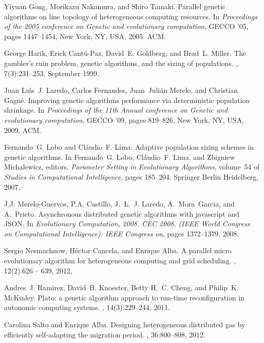 \documentclass[final,1p,times]{elsarticle}
\begin{document}
\begin{thebibliography}{10}
Yiyuan Gong, Morikazu Nakamura, and Shiro Tamaki.
\newblock Parallel genetic algorithms on line topology of heterogeneous
  computing resources.
\newblock In {\em Proceedings of the 2005 conference on Genetic and
  evolutionary computation}, GECCO '05, pages 1447--1454, New York, NY, USA,
  2005. ACM.

George Harik, Erick Cant\'{u}-Paz, David~E. Goldberg, and Brad~L. Miller.
\newblock The gambler's ruin problem, genetic algorithms, and the sizing of
  populations.
, 7(3):231--253, September 1999.

Juan Lu\'{\i}s~J. Laredo, Carlos Fernandes, Juan~Juli\'{a}n Merelo, and
  Christian Gagn{\'e}.
\newblock Improving genetic algorithms performance via deterministic population
  shrinkage.
\newblock In {\em Proceedings of the 11th Annual conference on Genetic and
  evolutionary computation}, GECCO '09, pages 819--826, New York, NY, USA,
  2009. ACM.

Fernando~G. Lobo and Cl\'{a}udio~F. Lima.
\newblock Adaptive population sizing schemes in genetic algorithms.
\newblock In Fernando~G. Lobo, Cl\'{a}udio~F. Lima, and Zbigniew Michalewicz,
  editors, {\em Parameter Setting in Evolutionary Algorithms}, volume~54 of
  {\em Studies in Computational Intelligence}, pages 185--204. Springer Berlin
  Heidelberg, 2007.

J.J. Merelo-Guervos, P.A. Castillo, J.~L.~J. Laredo, A.~Mora~Garcia, and
  A.~Prieto.
\newblock Asynchronous distributed genetic algorithms with javascript and
  {JSON}.
\newblock In {\em Evolutionary Computation, 2008. CEC 2008. (IEEE World
  Congress on Computational Intelligence). IEEE Congress on}, pages 1372--1379,
  2008.

Sergio Nesmachnow, H{\'e}ctor Cancela, and Enrique Alba.
\newblock A parallel micro evolutionary algorithm for heterogeneous computing
  and grid scheduling.
, 12(2):626 -- 639, 2012.

Andres~J. Ramirez, David~B. Knoester, Betty H.~C. Cheng, and Philip~K.
  McKinley.
\newblock Plato: a genetic algorithm approach to run-time reconfiguration in
  autonomic computing systems.
, 14(3):229--244, 2011.

Carolina Salto and Enrique Alba.
\newblock Designing heterogeneous distributed gas by efficiently self-adapting
  the migration period.
, 36:800--808, 2012.


\end{thebibliography}
\end{document}
